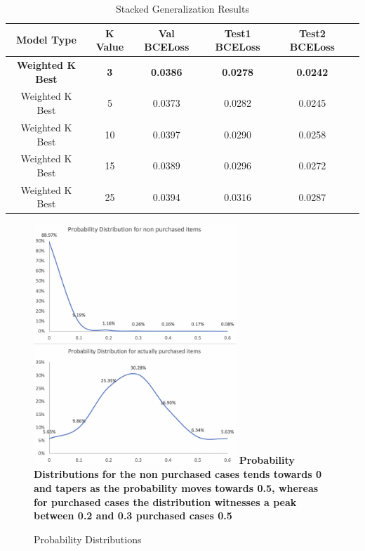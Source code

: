 \begin{table}[t]
\caption{ Stacked Generalization Results}
\vspace{0.1 in}
\centering
\resizebox{3.3in}{!}
{%
\begin{tabular}{|c|c|c|c|c|c|}
\hline
{\bf Model Type} & {\bf K Value} & {\bf Val BCELoss} & {\bf Test1 BCELoss} & {\bf Test2 BCELoss} \\ 
\hline\hline 
{\bf Weighted K Best}	  &  {\bf 3}  &  {\bf 0.0386} &  {\bf 0.0278} &  {\bf 0.0242}  \\ \hline
Weighted K Best	  		&  5  &  0.0373 &  0.0282 &  0.0245  \\ \hline
Weighted K Best	  		 &  10 &  0.0397 &  0.0290 &  0.0258  \\ \hline
Weighted K Best	  		 &  15 &  0.0389 &  0.0296 &  0.0272  \\ \hline
Weighted K Best	  		&  25  &  0.0394 &  0.0316 &  0.0287  \\ \hline
\end{tabular}
}
\label{tab:stacking}
\end{table}

  \begin{figure}[t]
    \centering 
    \caption{Probability Distributions} 
    \includegraphics[width=3in]{img/density.png} 
    {\bf Probability Distributions for the non purchased cases tends towards 0 and tapers as the 
    probability moves towards 0.5, whereas for purchased cases the distribution witnesses a peak 
    between 0.2 and 0.3 purchased cases  0.5} 
    \label{fig:density} 
  \end{figure}

